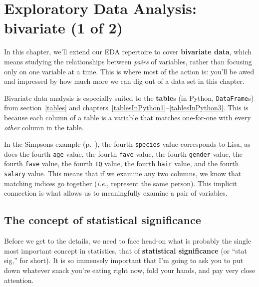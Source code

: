 
\chapter[EDA: bivariate (1 of 2)]{Exploratory Data Analysis: bivariate (1 of 2)}
\label{ch:edaBivariate}


In this chapter, we'll extend our EDA repertoire to cover \textbf{bivariate
data}, which means studying the relationships between \textit{pairs} of
variables, rather than focusing only on one variable at a time. This is where
most of the action is: you'll be awed and impressed by how much more we can dig
out of a data set in this chapter.


Bivariate data analysis is especially suited to the \textbf{table}s (in Python,
\texttt{DataFrame}s) from section~\ref{tables} and
chapters~\ref{tablesInPython1}--\ref{tablesInPython3}. This is because each
column of a table is a variable that matches one-for-one with every
\textit{other} column in the table.


In the Simpsons example (p.~\pageref{finalSimpsons}), the fourth
\texttt{species} value corresponds to Lisa, as does the fourth \texttt{age}
value, the fourth \texttt{fave} value, the fourth \texttt{gender} value,
the fourth \texttt{fave} value, the fourth \texttt{IQ} value, the fourth
\texttt{hair} value, and the fourth \texttt{salary} value. This means that if
we examine any two columns, we know that matching indices go together
(\textit{i.e.}, represent the same person). This implicit connection is what
allows us to meaningfully examine a pair of variables.

\section{The concept of statistical significance}


Before we get to the details, we need to face head-on what is probably the
single most important concept in statistics, that of \textbf{statistical
significance} (or ``stat sig,'' for short). It is so immensely important that
I'm going to ask you to put down whatever snack you're eating right now, fold
your hands, and pay very close attention.


